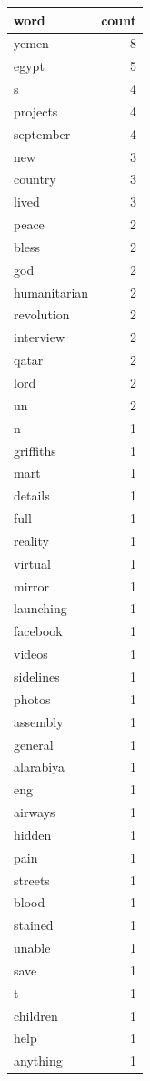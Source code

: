 \begin{tabular}{lr}
\toprule
word & count \\
\midrule
yemen & 8 \\
egypt & 5 \\
s & 4 \\
projects & 4 \\
september & 4 \\
new & 3 \\
country & 3 \\
lived & 3 \\
peace & 2 \\
bless & 2 \\
god & 2 \\
humanitarian & 2 \\
revolution & 2 \\
interview & 2 \\
qatar & 2 \\
lord & 2 \\
un & 2 \\
n & 1 \\
griffiths & 1 \\
mart & 1 \\
details & 1 \\
full & 1 \\
reality & 1 \\
virtual & 1 \\
mirror & 1 \\
launching & 1 \\
facebook & 1 \\
videos & 1 \\
sidelines & 1 \\
photos & 1 \\
assembly & 1 \\
general & 1 \\
alarabiya & 1 \\
eng & 1 \\
airways & 1 \\
hidden & 1 \\
pain & 1 \\
streets & 1 \\
blood & 1 \\
stained & 1 \\
unable & 1 \\
save & 1 \\
t & 1 \\
children & 1 \\
help & 1 \\
anything & 1 \\

\end{tabular}
